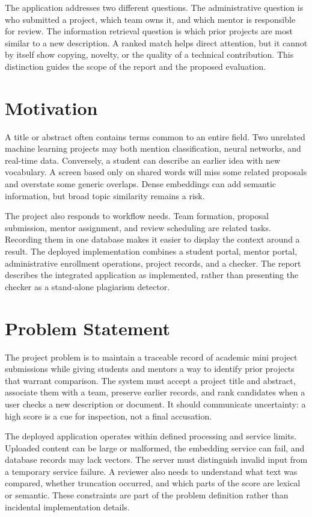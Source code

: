 \documentclass[12pt,a4paper]{report}
\begin{document}
The application addresses two different questions. The administrative question is who submitted a project, which team owns it, and which mentor is responsible for review. The information retrieval question is which prior projects are most similar to a new description. A ranked match helps direct attention, but it cannot by itself show copying, novelty, or the quality of a technical contribution. This distinction guides the scope of the report and the proposed evaluation.

\section{Motivation}
A title or abstract often contains terms common to an entire field. Two unrelated machine learning projects may both mention classification, neural networks, and real-time data. Conversely, a student can describe an earlier idea with new vocabulary. A screen based only on shared words will miss some related proposals and overstate some generic overlaps. Dense embeddings can add semantic information, but broad topic similarity remains a risk.

The project also responds to workflow needs. Team formation, proposal submission, mentor assignment, and review scheduling are related tasks. Recording them in one database makes it easier to display the context around a result. The deployed implementation combines a student portal, mentor portal, administrative enrollment operations, project records, and a checker. The report describes the integrated application as implemented, rather than presenting the checker as a stand-alone plagiarism detector.

\section{Problem Statement}
The project problem is to maintain a traceable record of academic mini project submissions while giving students and mentors a way to identify prior projects that warrant comparison. The system must accept a project title and abstract, associate them with a team, preserve earlier records, and rank candidates when a user checks a new description or document. It should communicate uncertainty: a high score is a cue for inspection, not a final accusation.

The deployed application operates within defined processing and service limits. Uploaded content can be large or malformed, the embedding service can fail, and database records may lack vectors. The server must distinguish invalid input from a temporary service failure. A reviewer also needs to understand what text was compared, whether truncation occurred, and which parts of the score are lexical or semantic. These constraints are part of the problem definition rather than incidental implementation details.
\end{document}
